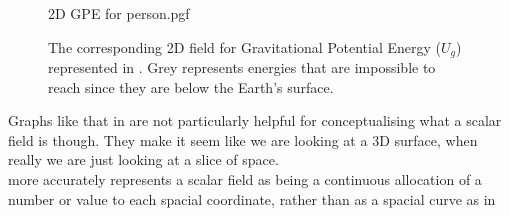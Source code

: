 \documentclass[main.tex]{subfiles}
\begin{document}
            \begin{figure}[!h]
                \centering
                \scalebox{1}
                {
                    \begin{adjustbox}{clip,trim=10mm 30mm 10mm 10mm}
                        {{2D GPE for person.pgf}}
                    \end{adjustbox}
                }
                \caption{The corresponding 2D field for Gravitational Potential Energy ($U_g$) represented in . Grey represents energies that are impossible to reach since they are below the Earth's surface.}
                \label{fig: 2D GPE}
            \end{figure}
            \FloatBarrier

            Graphs like that in  are not particularly helpful for conceptualising what a scalar field is though. They make it seem like we are looking at a 3D surface, when really we are just looking at a slice of space.\\
             more accurately represents a scalar field as being a continuous allocation of a number or value to each spacial coordinate, rather than as a spacial curve as in 
\end{document}
